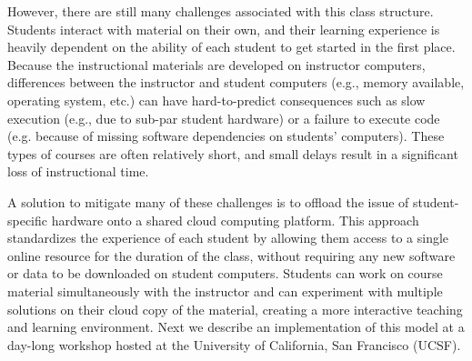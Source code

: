 However, there are still many challenges associated with this class structure.
Students interact with material on their own, and their learning experience is
heavily dependent on the ability of each student to get started in the first
place. Because the instructional materials are developed on instructor
computers, differences between the instructor and student computers (e.g., memory
available, operating system, etc.) can have hard-to-predict consequences such
as slow execution (e.g., due to sub-par student hardware) or a failure to
execute code (e.g. because of missing software dependencies on
students' computers). These types of courses are often relatively short,
and small delays result in a significant loss of instructional time.

A solution to mitigate many of these challenges is to offload the issue of
student-specific hardware onto a shared cloud computing platform. This approach
standardizes the experience of each student by allowing them access to a single
online resource for the duration of the class, without requiring any new
software or data to be downloaded on student computers. Students can work
on course material simultaneously with the instructor and can
experiment with multiple solutions on their cloud copy of the material,
creating a more interactive teaching and learning environment. Next we describe
an implementation of this model at a day-long workshop hosted at the
University of California, San Francisco (UCSF).
